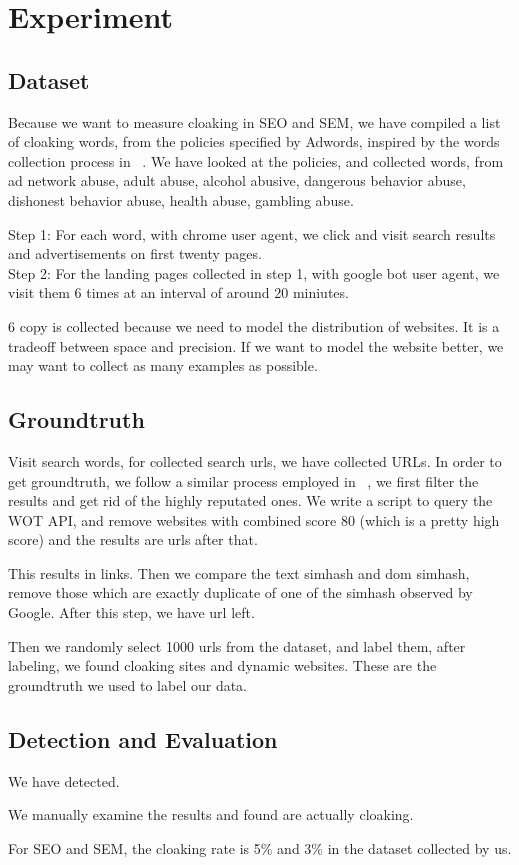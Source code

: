 \section{Experiment}
\label{s:experiment}

\subsection{Dataset}
Because we want to measure cloaking in SEO and SEM, we have compiled a list of
cloaking words, from the policies specified by Adwords, inspired by the words
collection process in ~\cite{wang2011cloak}. We have looked at the policies, and
collected  words, from ad network abuse, adult abuse, alcohol abusive, dangerous behavior
abuse, dishonest behavior abuse, health abuse, gambling abuse.

Step 1: For each word, with chrome user agent, we click and visit search results and advertisements on first
twenty pages. \\
Step 2: For the landing pages collected in step 1, with google bot user agent, we visit them 6 times at an
interval of around 20 miniutes.

6 copy is collected because we need to model the distribution of websites. It is
a tradeoff between space and precision. If we want to model the website better,
we may want to collect as many examples as possible.


\subsection{Groundtruth}

Visit  search words, for collected search urls, we have collected  URLs.
In order to get groundtruth, we follow a similar process employed in
~\cite{lin2009detection}, we first filter the results and get rid of the highly reputated ones. We write a
script to query the WOT API, and remove websites with combined score 80
(which is a pretty high score) and the results are  urls after that.

This results in  links. Then we compare the text simhash and dom
simhash, remove those which are exactly duplicate of one of the simhash observed
by Google. After this step, we have  url left.

Then we randomly select 1000 urls from the dataset, and label them, after
labeling, we found  cloaking sites and  dynamic websites.
These are the groundtruth we used to label our data.

\subsection{Detection and Evaluation}
We have detected.

We manually examine the results and found  are actually cloaking.

For SEO and SEM, the cloaking rate is 5\% and 3\% in the dataset collected by
us.



